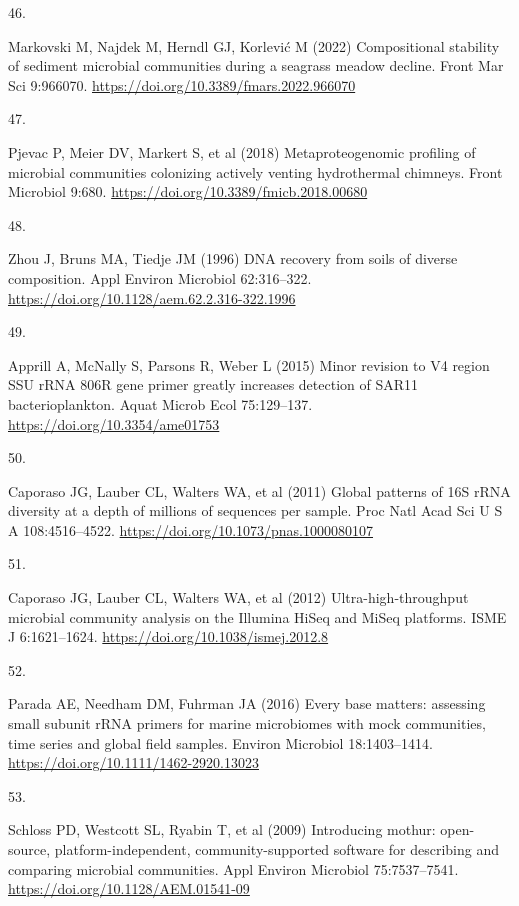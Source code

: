 \documentclass[
  12 pt,
]{article}
\newlength{\cslhangindent}
\newlength{\csllabelwidth}
\newenvironment{CSLReferences}[2] %
 {\begin{list}{}{%
  \setlength{\itemindent}{0pt}
  \setlength{\leftmargin}{0pt}
  \setlength{\parsep}{0pt}
  \ifodd #1
   \setlength{\leftmargin}{\cslhangindent}
   \setlength{\itemindent}{-1\cslhangindent}
  \fi
  \setlength{\itemsep}{#2\baselineskip}}}
 {\end{list}}
\newcommand{\CSLLeftMargin}[1]{\parbox[t]{\csllabelwidth}{\strut#1\strut}}
\newcommand{\CSLRightInline}[1]{\parbox[t]{\linewidth - \csllabelwidth}{\strut#1\strut}}
\begin{document}
\begin{CSLReferences}{0}{0}
\CSLLeftMargin{46. }%
\CSLRightInline{Markovski M, Najdek M, Herndl GJ, Korlević M (2022) Compositional stability of sediment microbial communities during a seagrass meadow decline. Front Mar Sci 9:966070. \url{https://doi.org/10.3389/fmars.2022.966070}}

\CSLLeftMargin{47. }%
\CSLRightInline{Pjevac P, Meier DV, Markert S, et al (2018) Metaproteogenomic profiling of microbial communities colonizing actively venting hydrothermal chimneys. Front Microbiol 9:680. \url{https://doi.org/10.3389/fmicb.2018.00680}}

\CSLLeftMargin{48. }%
\CSLRightInline{Zhou J, Bruns MA, Tiedje JM (1996) {DNA} recovery from soils of diverse composition. Appl Environ Microbiol 62:316--322. \url{https://doi.org/10.1128/aem.62.2.316-322.1996}}

\CSLLeftMargin{49. }%
\CSLRightInline{Apprill A, McNally S, Parsons R, Weber L (2015) Minor revision to {V4} region {SSU rRNA 806R} gene primer greatly increases detection of {SAR11} bacterioplankton. Aquat Microb Ecol 75:129--137. \url{https://doi.org/10.3354/ame01753}}

\CSLLeftMargin{50. }%
\CSLRightInline{Caporaso JG, Lauber CL, Walters WA, et al (2011) Global patterns of {16S rRNA} diversity at a depth of millions of sequences per sample. Proc Natl Acad Sci U S A 108:4516--4522. \url{https://doi.org/10.1073/pnas.1000080107}}

\CSLLeftMargin{51. }%
\CSLRightInline{Caporaso JG, Lauber CL, Walters WA, et al (2012) Ultra-high-throughput microbial community analysis on the {Illumina HiSeq} and {MiSeq} platforms. ISME J 6:1621--1624. \url{https://doi.org/10.1038/ismej.2012.8}}

\CSLLeftMargin{52. }%
\CSLRightInline{Parada AE, Needham DM, Fuhrman JA (2016) Every base matters: assessing small subunit {rRNA} primers for marine microbiomes with mock communities, time series and global field samples. Environ Microbiol 18:1403--1414. \url{https://doi.org/10.1111/1462-2920.13023}}

\CSLLeftMargin{53. }%
\CSLRightInline{Schloss PD, Westcott SL, Ryabin T, et al (2009) Introducing mothur: open-source, platform-independent, community-supported software for describing and comparing microbial communities. Appl Environ Microbiol 75:7537--7541. \url{https://doi.org/10.1128/AEM.01541-09}}


\end{CSLReferences}
\end{document}
